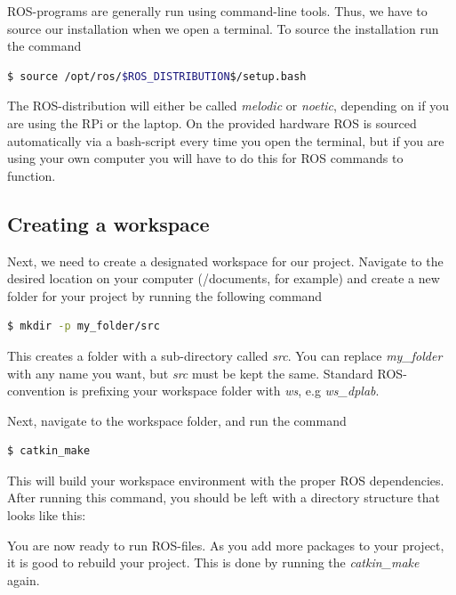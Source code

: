 \documentclass{ol-softwaremanual}
\begin{document}
ROS-programs are generally run using command-line tools. Thus, we have to source our installation when we open a terminal. To source the installation run the command
\begin{lstlisting}[language=bash,basicstyle=\mlttfamily, breaklines=true]
  $ source /opt/ros/$ROS_DISTRIBUTION$/setup.bash
\end{lstlisting}

The ROS-distribution will either be called \textit{melodic} or \textit{noetic}, depending on if you are using the RPi or the laptop. On the provided hardware ROS is sourced automatically via a bash-script every time you open the terminal, but if you are using your own computer you will have to do this for ROS commands to function.

\subsection{Creating a workspace}

Next, we need to create a designated workspace for our project. Navigate to the desired location on your computer (/documents, for example) and create a new folder for your project by running the following command

\begin{lstlisting}[language=bash,basicstyle=\mlttfamily, breaklines=true]
  $ mkdir -p my_folder/src
\end{lstlisting}

This creates a folder with a sub-directory called \textit{src}. You can replace \textit{my\_folder} with any name you want, but \textit{src} must be kept the same. Standard ROS-convention is prefixing your workspace folder with \textit{ws}, e.g \textit{ws\_dplab}.

Next, navigate to the workspace folder, and run the command

\begin{lstlisting}[language=bash,basicstyle=\mlttfamily, breaklines=true]
  $ catkin_make
\end{lstlisting}

This will build your workspace environment with the proper ROS dependencies. After running this command, you should be left with a directory structure that looks like this: 


You are now ready to run ROS-files. As you add more packages to your project, it is good to rebuild your project. This is done by running the \textit{catkin\_make} again.
\end{document}
